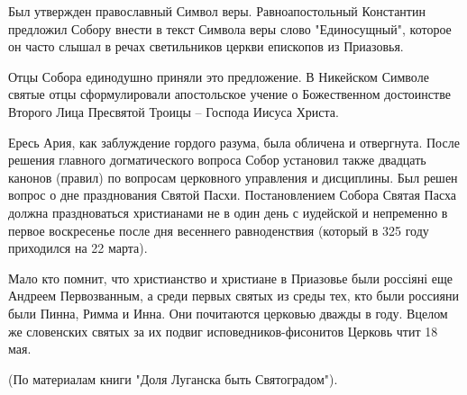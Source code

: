 Был утвержден православный Символ веры. Равноапостольный Константин предложил
Собору внести в текст Символа веры слово "Единосущный", которое он часто слышал
в речах  светильников церкви епископов из Приазовья.

Отцы Собора единодушно приняли это предложение. В Никейском Символе святые отцы
сформулировали апостольское учение о Божественном достоинстве Второго Лица
Пресвятой Троицы – Господа Иисуса Христа. 

Ересь Ария, как заблуждение гордого разума, была обличена и отвергнута. После
решения главного догматического вопроса Собор установил также двадцать канонов
(правил) по вопросам церковного управления и дисциплины. Был решен вопрос о дне
празднования Святой Пасхи. Постановлением Собора Святая Пасха должна
праздноваться христианами не в один день с иудейской и непременно в первое
воскресенье после дня весеннего равноденствия (который в 325 году приходился на
22 марта). 

Мало кто помнит, что христианство и христиане в Приазовье были россіяні еще
Андреем Первозванным, а среди первых святых из среды тех, кто были россияни
были Пинна, Римма и Инна. Они почитаются церковью дважды в году. Вцелом же
словенских святых за их подвиг исповедников-фисонитов Церковь чтит 18 мая.

(По материалам книги "Доля Луганска быть Святоградом").
